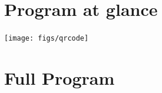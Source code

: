 \documentclass[11pt,twoside]{book}
\begin{document}
\chapter{Program at glance}
\noindent{}
\begin{flushright}
\texttt{[image: figs/qrcode]}
\end{flushright}

\chapter{Full Program}

\end{document}
